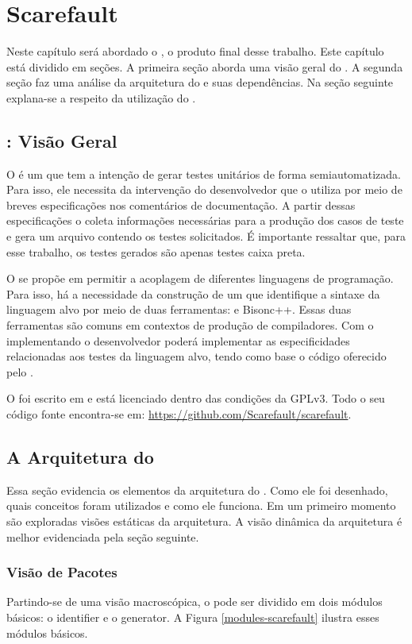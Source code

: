 \chapter[Scarefault]{Scarefault}
Neste capítulo será abordado o \Scarefault, o produto final desse
trabalho. Este capítulo está dividido em seções. A primeira seção aborda
uma visão geral do \Scarefault. A segunda seção faz uma análise da
arquitetura do \framework e suas dependências. Na seção seguinte explana-se
a respeito da utilização do \Scarefault.

\section{\Scarefault: Visão Geral}
O \scarefault é um \framework que tem a intenção de gerar testes unitários
de forma semiautomatizada. Para isso, ele necessita da intervenção do
desenvolvedor que o utiliza por meio de breves especificações nos
comentários de documentação. A partir dessas especificações o \scarefault
coleta informações necessárias para a produção dos casos de teste e gera
um arquivo contendo os testes solicitados. É importante ressaltar que,
para esse trabalho, os testes gerados são apenas testes caixa preta.

O \framework se propõe em permitir a acoplagem de diferentes linguagens
de programação. Para isso, há a necessidade da construção de um \parser
que identifique a sintaxe da linguagem alvo por meio de duas
ferramentas: \flexcpp e \textsf{Bisonc++}. Essas duas ferramentas são
comuns em contextos de produção de compiladores. Com o \parser
implementando o desenvolvedor poderá implementar as especificidades
relacionadas aos testes da linguagem alvo, tendo como base o código
oferecido pelo \Scarefault.

O \scarefault foi escrito em \cpp e está licenciado dentro das condições
da \textsf{GPLv3}. Todo o seu código fonte encontra-se em:
\url{https://github.com/Scarefault/scarefault}.

\section{A Arquitetura do \scarefault}
Essa seção evidencia os elementos da arquitetura do \Scarefault. Como
ele foi desenhado, quais conceitos foram utilizados e como ele funciona.
Em um primeiro momento são exploradas visões estáticas da arquitetura.
A visão dinâmica da arquitetura é melhor evidenciada pela seção seguinte.

\subsection{Visão de Pacotes}
Partindo-se de uma visão macroscópica, o \scarefault pode ser dividido em
dois módulos básicos: o \textsf{identifier} e o \textsf{generator}. A Figura
\ref{modules-scarefault} ilustra esses módulos básicos.

